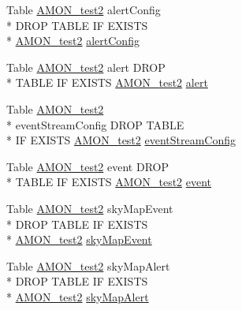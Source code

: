 \begin{DoxyCompactItemize}
Table \hyperlink{db__mc__build_8sql_a19c21c59303d8b6591b92240ff7de1d5}{A\-M\-O\-N\-\_\-test2} alert\-Config \\*
D\-R\-O\-P T\-A\-B\-L\-E I\-F E\-X\-I\-S\-T\-S \\*
\hyperlink{db__mc__build_8sql_a19c21c59303d8b6591b92240ff7de1d5}{A\-M\-O\-N\-\_\-test2} \hyperlink{db__mc__build_8sql_a646822aff454043dee3c2257149e179e}{alert\-Config}
\item 
Table \hyperlink{db__mc__build_8sql_a19c21c59303d8b6591b92240ff7de1d5}{A\-M\-O\-N\-\_\-test2} alert D\-R\-O\-P \\*
T\-A\-B\-L\-E I\-F E\-X\-I\-S\-T\-S \hyperlink{db__mc__build_8sql_a19c21c59303d8b6591b92240ff7de1d5}{A\-M\-O\-N\-\_\-test2} \hyperlink{db__mc__build_8sql_ade03c26fadf10dd5f553e178044321d0}{alert}
\item 
Table \hyperlink{db__mc__build_8sql_a19c21c59303d8b6591b92240ff7de1d5}{A\-M\-O\-N\-\_\-test2} \\*
event\-Stream\-Config D\-R\-O\-P T\-A\-B\-L\-E \\*
I\-F E\-X\-I\-S\-T\-S \hyperlink{db__mc__build_8sql_a19c21c59303d8b6591b92240ff7de1d5}{A\-M\-O\-N\-\_\-test2} \hyperlink{db__mc__build_8sql_a1604519dea42a59ed881eee0de86ba38}{event\-Stream\-Config}
\item 
Table \hyperlink{db__mc__build_8sql_a19c21c59303d8b6591b92240ff7de1d5}{A\-M\-O\-N\-\_\-test2} event D\-R\-O\-P \\*
T\-A\-B\-L\-E I\-F E\-X\-I\-S\-T\-S \hyperlink{db__mc__build_8sql_a19c21c59303d8b6591b92240ff7de1d5}{A\-M\-O\-N\-\_\-test2} \hyperlink{db__mc__build_8sql_a53de2cc91ad7a64a91aeecf1826683b7}{event}
\item 
Table \hyperlink{db__mc__build_8sql_a19c21c59303d8b6591b92240ff7de1d5}{A\-M\-O\-N\-\_\-test2} sky\-Map\-Event \\*
D\-R\-O\-P T\-A\-B\-L\-E I\-F E\-X\-I\-S\-T\-S \\*
\hyperlink{db__mc__build_8sql_a19c21c59303d8b6591b92240ff7de1d5}{A\-M\-O\-N\-\_\-test2} \hyperlink{db__mc__build_8sql_acdb25ebea89bf6ef9016d7392475b866}{sky\-Map\-Event}
\item 
Table \hyperlink{db__mc__build_8sql_a19c21c59303d8b6591b92240ff7de1d5}{A\-M\-O\-N\-\_\-test2} sky\-Map\-Alert \\*
D\-R\-O\-P T\-A\-B\-L\-E I\-F E\-X\-I\-S\-T\-S \\*
\hyperlink{db__mc__build_8sql_a19c21c59303d8b6591b92240ff7de1d5}{A\-M\-O\-N\-\_\-test2} \hyperlink{db__mc__build_8sql_a0c1193a567dbface05c887b539ec4e3f}{sky\-Map\-Alert}

\end{DoxyCompactItemize}
